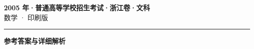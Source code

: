 \documentclass[zihao=5, a4paper]{ctexart}
\begin{document}
\begin{center}
  {\Large\bfseries 2005 年·普通高等学校招生考试·浙江卷·文科}\\[4pt]
  {\large 数学 · 印刷版}
\end{center}
\medskip
{}

\par\bigskip\hrule\bigskip
{}
\begin{center}{\large\bfseries 参考答案与详细解析}\end{center}
\smallskip

\end{document}
